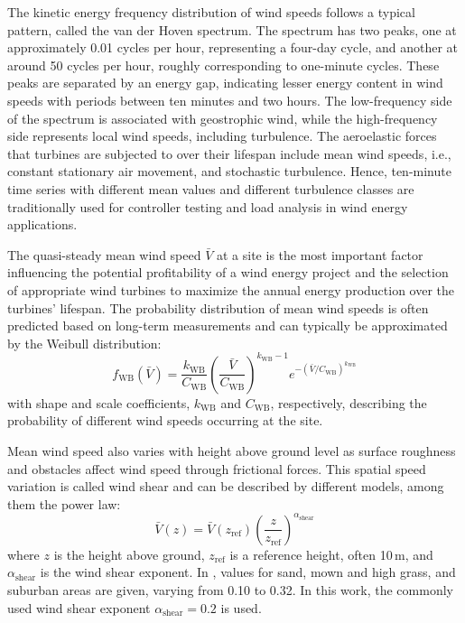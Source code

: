 The kinetic energy frequency distribution of wind speeds follows a typical pattern, called the van der Hoven spectrum. The spectrum has two peaks, one at approximately 0.01 cycles per hour, representing a four-day cycle, and another at around 50 cycles per hour, roughly corresponding to one-minute cycles. These peaks are separated by an energy gap, indicating lesser energy content in wind speeds with periods between ten minutes and two hours. The low-frequency side of the spectrum is associated with geostrophic wind, while the high-frequency side represents local wind speeds, including turbulence. The aeroelastic forces that turbines are subjected to over their lifespan include mean wind speeds, i.e., constant stationary air movement, and stochastic turbulence. Hence, ten-minute time series with different mean values and different turbulence classes are traditionally used for controller testing and load analysis in wind energy applications.

The quasi-steady mean wind speed $\bar{V}$ at a site is the most important factor influencing the potential profitability of a wind energy project and the selection of appropriate wind turbines to maximize the annual energy production over the turbines' lifespan. The probability distribution of mean wind speeds is often predicted based on long-term measurements and can typically be approximated by the Weibull distribution:
\begin{equation}
    f_{\text{WB}}(\bar{V}) = \frac{k_{\text{WB}}}{C_{\text{WB}}}\left(\frac{\bar{V}}{C_{\text{WB}}}\right)^{k_{\text{WB}}-1}e^{- (\bar{V}/C_{\text{WB}})^{k_{\text{WB}}}}
\end{equation}
with shape and scale coefficients, $k_{\text{WB}}$ and $C_{\text{WB}}$, respectively, describing the probability of different wind speeds occurring at the site.

Mean wind speed also varies with height above ground level as surface roughness and obstacles affect wind speed through frictional forces. This spatial speed variation is called wind shear and can be described by different models, among them the power law:
\begin{equation}
    \bar{V}(z) =  \bar{V}(z_{\text{ref}})\left(\frac{z} {z_{\text{ref}} }\right)^{\alpha_{\text{shear}}} 
\end{equation}
where $z$ is the height above ground, $z_{\text{ref}}$ is a reference height, often 10\,m, and $\alpha_{\text{shear}}$ is the wind shear exponent. In \cite{Bianchi2007}, values for sand, mown and high grass, and suburban areas are given, varying from 0.10 to 0.32. In this work, the commonly used wind shear exponent $\alpha_{\text{shear}} = 0.2$ is used.


